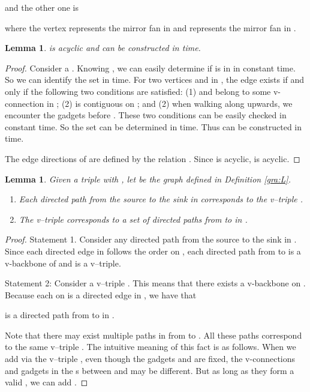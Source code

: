 \documentclass[11pt]{article}
\newtheorem{lemma}[figure]{Lemma}
\begin{document}
and the other one is

where the vertex  represents the mirror fan in 
and  represents the mirror fan in .

\begin{lemma}\label{lemma:GL}
 is acyclic and can be constructed in  time.
\end{lemma}

\begin{proof}
Consider a . Knowing , we can easily determine
if  is in  in constant time. So we can identify
the set  in  time.
For two vertices  and  in , the edge
 exists if and only if the following
two conditions are satisfied:
(1)  and  belong to some v-connection in ;
(2)  is contiguous on ; and
(2) when walking along  upwards, we encounter the gadgets 
before .
These two conditions can be easily checked in constant time.
So the set  can be determined
in  time. Thus  can be constructed
in  time.

The edge directions of  are defined by the relation .
Since  is acyclic,  is acyclic.
\end{proof}



\begin{lemma}\label{lemma:feasibility}
Given a triple  with , let  be the graph
defined in Definition \ref{gra:L}.

\begin{enumerate}
\item Each directed path from the source to the sink
in  corresponds to the v--triple .





\item The v--triple  corresponds to a set of
directed paths from  to  in .

\end{enumerate}
\end{lemma}

\begin{proof}
Statement 1.
Consider any directed path  from the source  to the sink
 in .
Since each directed edge  in 
follows the order  on ,
each directed path from  to  is a v-backbone of 
and  is a v--triple.

Statement 2: Consider a v--triple . This means
that there exists a v-backbone
 on .
Because each  on  is a directed edge 
in ,
we have that

is a directed path from  to  in .

Note that there may exist multiple paths in  from  to
. All these paths correspond to the same v--triple
. The intuitive meaning of this fact is as follows.
When we add  via the v--triple , even though
the gadgets  and  are fixed, the v-connections and gadgets in the
s between  and 
may be different. But as long as they form a valid
, we can add .
\end{proof}
\end{document}
